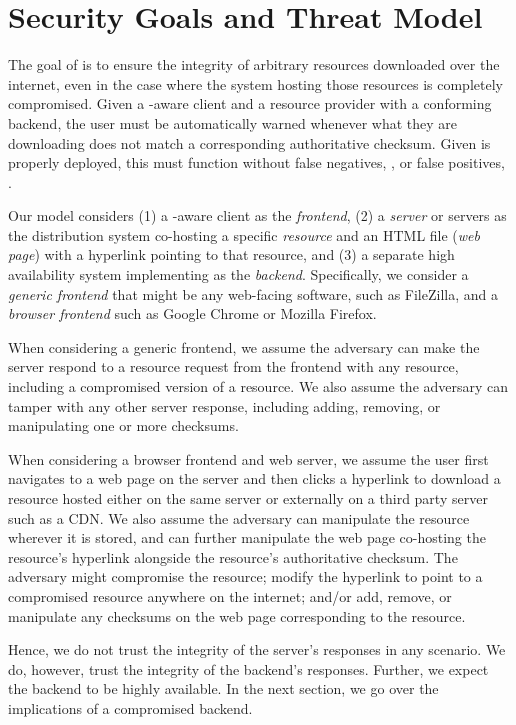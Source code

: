 \section{Security Goals and Threat Model} \label{sec:model}

The goal of \SYSTEM{} is to ensure the integrity of arbitrary resources
downloaded over the internet, even in the case where the system hosting those
resources is completely compromised. Given a \SYSTEM{}-aware client and a
resource provider with a conforming backend, the user must be automatically
warned whenever what they are downloading does not match a corresponding
authoritative checksum. Given \SYSTEM{} is properly deployed, this must function
without false negatives, , or false positives, .

Our model considers (1) a \SYSTEM{}-aware client as the \emph{frontend}, (2) a
\emph{server} or servers as the distribution system co-hosting a specific
\emph{resource} and an HTML file (\emph{web page}) with a hyperlink pointing to
that resource, and (3) a separate high availability system implementing
\SYSTEM{} as the \emph{backend}. Specifically, we consider a \emph{generic
frontend} that might be any web-facing software, such as FileZilla, and a
\emph{browser frontend} such as Google Chrome or Mozilla Firefox.

When considering a generic frontend, we assume the adversary can make the server
respond to a resource request from the frontend with any resource, including a
compromised version of a resource. We also assume the adversary can tamper with
any other server response, including adding, removing, or manipulating one or
more checksums.

When considering a browser frontend and web server, we assume the user first
navigates to a web page on the server and then clicks a hyperlink to download a
resource hosted either on the same server or externally on a third party server
such as a CDN. We also assume the adversary can manipulate the resource wherever
it is stored, and can further manipulate the web page co-hosting the resource's
hyperlink alongside the resource's authoritative checksum. The adversary might
compromise the resource; modify the hyperlink to point to a compromised resource
anywhere on the internet; and/or add, remove, or manipulate any checksums on the
web page corresponding to the resource.

Hence, we do not trust the integrity of the server's responses in any scenario.
We do, however, trust the integrity of the backend's responses. Further, we
expect the backend to be highly available. In the next section, we go over the
implications of a compromised backend.

